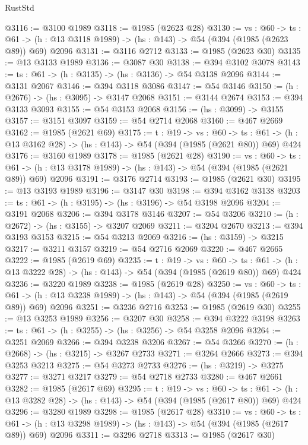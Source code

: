 \begin{lexlean}{RustStd}
\begin{coremodule}
@3116 := @3100 @1989
@3118 := @1985 (@2623 @28)
@3130 := {vs : @60} ->
  {ts : @61} -> (h : @13 @3118 @1989) -> (hs : @143) -> @54 (@394 (@1985 (@2623 @89)) @69) @2096
@3131 := @3116 @2712
@3133 := @1985 (@2623 @30)
@3135 := @13 @3133 @1989
@3136 := @3087 @30
@3138 := @394 @3102 @3078
@3143 := {ts : @61} -> (h : @3135) -> (hs : @3136) -> @54 @3138 @2096
@3144 := @3131 @2067
@3146 := @394 @3118 @3086
@3147 := @54 @3146
@3150 := (h : @2676) -> (hs : @3095) -> @3147 @2068
@3151 := @3144 @2674
@3153 := @394 @3133 @3093
@3155 := @54 @3153 @2068
@3156 := (hs : @3099) -> @3155
@3157 := @3151 @3097
@3159 := @54 @2714 @2068
@3160 := @467 @2669
@3162 := @1985 (@2621 @69)
@3175 := {t : @19} ->
  {vs : @60} ->
  {ts : @61} -> (h : @13 @3162 @28) -> (hs : @143) -> @54 (@394 (@1985 (@2621 @80)) @69) @424
@3176 := @3160 @1989
@3178 := @1985 (@2621 @28)
@3190 := {vs : @60} ->
  {ts : @61} -> (h : @13 @3178 @1989) -> (hs : @143) -> @54 (@394 (@1985 (@2621 @89)) @69) @2096
@3191 := @3176 @2714
@3193 := @1985 (@2621 @30)
@3195 := @13 @3193 @1989
@3196 := @3147 @30
@3198 := @394 @3162 @3138
@3203 := {ts : @61} -> (h : @3195) -> (hs : @3196) -> @54 @3198 @2096
@3204 := @3191 @2068
@3206 := @394 @3178 @3146
@3207 := @54 @3206
@3210 := (h : @2672) -> (hs : @3155) -> @3207 @2069
@3211 := @3204 @2670
@3213 := @394 @3193 @3153
@3215 := @54 @3213 @2069
@3216 := (hs : @3159) -> @3215
@3217 := @3211 @3157
@3219 := @54 @2716 @2069
@3220 := @467 @2665
@3222 := @1985 (@2619 @69)
@3235 := {t : @19} ->
  {vs : @60} ->
  {ts : @61} -> (h : @13 @3222 @28) -> (hs : @143) -> @54 (@394 (@1985 (@2619 @80)) @69) @424
@3236 := @3220 @1989
@3238 := @1985 (@2619 @28)
@3250 := {vs : @60} ->
  {ts : @61} -> (h : @13 @3238 @1989) -> (hs : @143) -> @54 (@394 (@1985 (@2619 @89)) @69) @2096
@3251 := @3236 @2716
@3253 := @1985 (@2619 @30)
@3255 := @13 @3253 @1989
@3256 := @3207 @30
@3258 := @394 @3222 @3198
@3263 := {ts : @61} -> (h : @3255) -> (hs : @3256) -> @54 @3258 @2096
@3264 := @3251 @2069
@3266 := @394 @3238 @3206
@3267 := @54 @3266
@3270 := (h : @2668) -> (hs : @3215) -> @3267 @2733
@3271 := @3264 @2666
@3273 := @394 @3253 @3213
@3275 := @54 @3273 @2733
@3276 := (hs : @3219) -> @3275
@3277 := @3271 @3217
@3279 := @54 @2718 @2733
@3280 := @467 @2661
@3282 := @1985 (@2617 @69)
@3295 := {t : @19} ->
  {vs : @60} ->
  {ts : @61} -> (h : @13 @3282 @28) -> (hs : @143) -> @54 (@394 (@1985 (@2617 @80)) @69) @424
@3296 := @3280 @1989
@3298 := @1985 (@2617 @28)
@3310 := {vs : @60} ->
  {ts : @61} -> (h : @13 @3298 @1989) -> (hs : @143) -> @54 (@394 (@1985 (@2617 @89)) @69) @2096
@3311 := @3296 @2718
@3313 := @1985 (@2617 @30)

\end{coremodule}
\end{lexlean}
